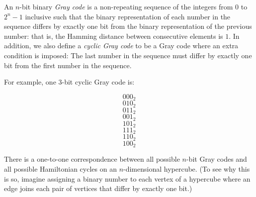 \documentclass[12pt]{article}
\begin{document}
An $n$-bit binary \emph{Gray code} is a non-repeating sequence of the integers from $0$ to $2^n-1$ inclusive such that the binary representation of each number in the sequence differs by exactly one bit from the binary representation of the previous number: that is, the Hamming distance between consecutive elements is $1$.  In addition, we also define a \emph{cyclic Gray code} to be a Gray code where an extra condition is imposed:  The last number in the sequence must differ by exactly one bit from the first number in the sequence.

For example, one $3$-bit cyclic Gray code is:

$$000_2$$
$$010_2$$
$$011_2$$
$$001_2$$
$$101_2$$
$$111_2$$
$$110_2$$
$$100_2$$

There is a one-to-one correspondence between all possible $n$-bit Gray codes and all possible Hamiltonian cycles on an $n$-dimensional hypercube.  (To see why this is so, imagine assigning a binary number to each vertex of a hypercube where an edge joins each pair of vertices that differ by exactly one bit.)
\end{document}
